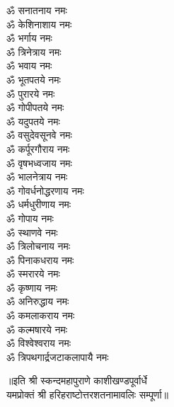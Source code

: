 \begin{multicols}{2}
\begin{flushleft}
ॐ सनातनाय नमः\\
ॐ केशिनाशाय नमः\\
ॐ भर्गाय नमः\\
ॐ त्रिनेत्राय नमः\\
ॐ भवाय नमः\\
ॐ भूतपतये नमः\\
ॐ पुरारये नमः\\
ॐ गोपीपतये नमः\hfill{}\\
ॐ यदुपतये नमः\\
ॐ वसुदेवसूनवे नमः\\
ॐ कर्पूरगौराय नमः\\
ॐ वृषभध्वजाय नमः\\
ॐ भालनेत्राय नमः\\
ॐ गोवर्धनोद्धरणाय नमः\\
ॐ धर्मधुरीणाय नमः\\
ॐ गोपाय नमः\\
ॐ स्थाणवे नमः\\
ॐ त्रिलोचनाय नमः\hfill{}\\
ॐ पिनाकधराय नमः\\
ॐ स्मरारये नमः\\
ॐ कृष्णाय नमः\\
ॐ अनिरुद्धाय नमः\\
ॐ कमलाकराय नमः\\
ॐ कल्मषारये नमः\\
ॐ विश्वेश्वराय नमः\\
ॐ त्रिपथगार्द्रजटाकलापायै नमः\\
\end{flushleft}
\end{multicols}
॥इति श्री स्कन्दमहापुराणे काशीखण्डपूर्वार्धे\\यमप्रोक्तं श्री हरिहराष्टोत्तरशतनामावलिः सम्पूर्णा॥
